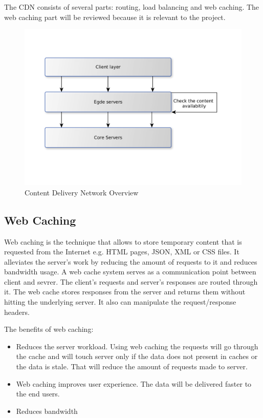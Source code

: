 The CDN consists of several parts: routing, load balancing and web caching\cite{CDNOverview}. The web caching part will be reviewed because it is relevant to the project.

\begin{figure}[h]
    \centering
    \includegraphics[width=\textwidth]{images/cdn_arch.png}
    \caption{Content Delivery Network Overview}
    \label{fig:cdn_overview}
\end{figure}

\subsection{Web Caching}

Web caching is the technique that allows to store temporary content that is requested from the Internet e.g. HTML pages, JSON, XML or CSS files. It alleviates the server's work by reducing the amount of requests to it and reduces bandwidth usage\cite{WebCachingInterior}. A web cache system serves as a communication point between client and sevrer. The client's requests and server's responses are routed through it. The web cache stores responses from the server and returns them without hitting the underlying server. It also can manipulate the request/response headers.

The benefits of web caching:

\begin{itemize}
    \item Reduces the server workload. Using web caching the requests will go through the cache and will touch server only if the data does not present in caches or the data is stale. That will reduce the amount of requests made to server.
    \item Web caching improves user experience. The data will be delivered faster to the end users.
    \item Reduces bandwidth
\end{itemize}

